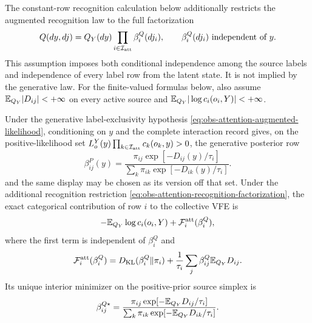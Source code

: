 The constant-row recognition calculation below additionally restricts the
augmented recognition law to the full factorization
\begin{equation}
Q(dy,dj)=Q_Y(dy)
\prod_{i\in\mathcal I_{\rm att}}\beta_i^Q(dj_i),
\qquad \beta_i^Q(dj_i)\ \text{independent of }y.
\label{eq:obs-attention-recognition-factorization}
\end{equation}
This assumption imposes both conditional independence among the source labels
and independence of every label row from the latent state.  It is not implied
by the generative law.  For the finite-valued formulas below, also assume
$\mathbb E_{Q_Y}|D_{ij}|<+\infty$ on every active source and
$\mathbb E_{Q_Y}|\log c_i(o_i,Y)|<+\infty$.  

Under the generative label-exclusivity hypothesis
\eqref{eq:obs-attention-augmented-likelihood}, conditioning on $y$ and the
complete interaction record gives, on the positive-likelihood set
$L_o^Y(y)\prod_{k\in\mathcal I_{\rm att}}c_k(o_k,y)>0$, the generative
posterior row
\begin{equation}
\beta^P_{ij}(y)
=\frac{\pi_{ij}\exp[-D_{ij}(y)/\tau_i]}
{\sum_k\pi_{ik}\exp[-D_{ik}(y)/\tau_i]}.
\label{eq:obs-attention-posterior}
\end{equation}
and the same display may be chosen as its version off that set.  Under the
additional recognition restriction
\eqref{eq:obs-attention-recognition-factorization}, the exact categorical
contribution of row $i$ to the collective VFE is
\begin{equation}
-\mathbb E_{Q_Y}\log c_i(o_i,Y)+\mathcal F_i^{\rm att}(\beta_i^Q),
\label{eq:obs-attention-full-contribution}
\end{equation}
where the first term is independent of $\beta_i^Q$ and
\begin{equation}
\mathcal F_i^{\rm att}(\beta^Q_i)
=D_{\mathrm{KL}}(\beta^Q_i\Vert\pi_i)
+\frac{1}{\tau_i}\sum_j\beta^Q_{ij}\mathbb E_{Q_Y}D_{ij}.
\label{eq:obs-attention-vfe}
\end{equation}
Its unique interior minimizer on the positive-prior source simplex is
\begin{equation}
\beta^{Q\star}_{ij}
=\frac{\pi_{ij}\exp[-\mathbb E_{Q_Y}D_{ij}/\tau_i]}
{\sum_k\pi_{ik}\exp[-\mathbb E_{Q_Y}D_{ik}/\tau_i]}.
\label{eq:obs-attention-recognition-optimum}
\end{equation}

